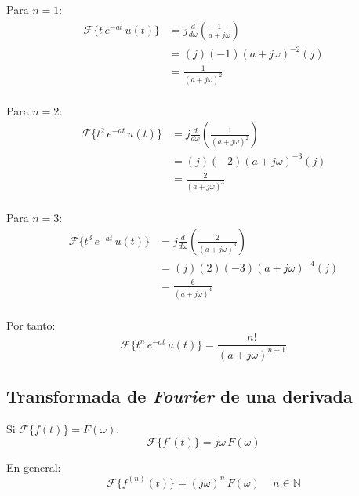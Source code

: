 Para $n=1$:
\begin{equation*}
\begin{split}
    \mathcal{F}\{t\,e^{-at}\,u(t)\}
        &=j\frac{d}{d\omega}\left(\frac{1}{a+j\omega}\right)\\
        &=(j)(-1){(a+j\omega)}^{-2}(j)\\
        &=\frac{1}{{(a+j\omega)}^2}\\
\end{split}
\end{equation*}

Para $n=2$:
\begin{equation*}
\begin{split}
    \mathcal{F}\{t^2\,e^{-at}\,u(t)\}
        &=j\frac{d}{d\omega}\left(\frac{1}{{(a+j\omega)}^2}\right)\\
        &=(j)(-2){(a+j\omega)}^{-3}(j)\\
        &=\frac{2}{{(a+j\omega)}^3}\\
\end{split}
\end{equation*}

Para $n=3$:
\begin{equation*}
\begin{split}
    \mathcal{F}\{t^3\,e^{-at}\,u(t)\}
        &=j\frac{d}{d\omega}\left(\frac{2}{{(a+j\omega)}^3}\right)\\
        &=(j)(2)(-3){(a+j\omega)}^{-4}(j)\\
        &=\frac{6}{{(a+j\omega)}^4}\\
\end{split}
\end{equation*}

Por tanto:
\begin{equation}
    \mathcal{F}\{t^n\,e^{-at}\,u(t)\}=\frac{n!}{{(a+j\omega)}^{n+1}}
\end{equation}

\subsection{Transformada de \emph{Fourier} de una derivada}
Si $\mathcal{F}\{f(t)\}=F(\omega)$:
\begin{equation*}
    \mathcal{F}\{f'(t)\}=j\omega\,F(\omega)
\end{equation*}

En general:
\begin{equation}
    \mathcal{F}\{f^{(n)}(t)\}={(j\omega)}^n\,F(\omega)
    \quad\,n\in\mathbb{N}
\end{equation}

